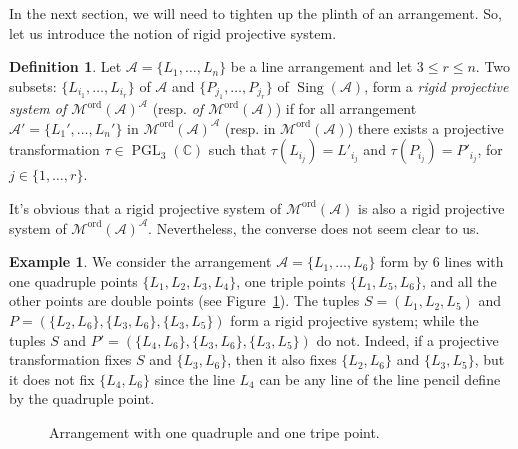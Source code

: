 \documentclass[11pt, a4paper]{amsart}
\theoremstyle{definition}
\newtheorem{definition}[theorem]{Definition}
\newtheorem{example}[theorem]{Example}
\theoremstyle{remark}
\newcommand{\CC}{\mathds{C}}
\newcommand{\A}{\mathcal{A}}
\newcommand{\M}{\mathcal{M}}
\newcommand{\ord}{\text{ord}}
\DeclareMathOperator{\sing}{Sing}
\DeclareMathOperator{\PGL}{PGL}
\begin{document}
In the next section, we will need to tighten up the plinth of an arrangement. So, let us introduce the notion of rigid projective system.

\begin{definition}\label{def:RPS}
	Let $\A=\{L_1,\dots,L_n\}$  be a line arrangement and let $3 \leq r \leq n$. Two subsets: $\{L_{i_1},\dots,L_{i_r}\}$ of $\A$ and $\{P_{j_1},\dots,P_{j_r}\}$ of $\sing(\A)$, form a \emph{rigid projective system of $\M^\ord(\A)^\A$} (resp. \emph{of $\M^\ord(\A)$}) if for all arrangement $\A'=\{L_1',\dots,L_n'\}$ in $\M^\ord(\A)^\A$ (resp. in $\M^\ord(\A)$) there exists a projective transformation $\tau\in\PGL_3(\CC)$ such that $\tau(L_{i_j})=L'_{i_j}$ and $\tau(P_{i_j})=P'_{i_j}$, for $j\in\{1,\dots,r\}$. 
\end{definition}

It's obvious that a rigid projective system of $\M^\ord(\A)$ is also a rigid projective system of $\M^\ord(\A)^\A$. Nevertheless, the converse does not seem clear to us.

\begin{example}\label{ex:plinth}
	We consider the arrangement $\A=\{L_1,\dots,L_6\}$ form by 6 lines with one quadruple points $\{L_1,L_2,L_3,L_4\}$, one triple points $\{L_1,L_5,L_6\}$, and all the other points are double points (see Figure~\ref{fig:arr_1}). The tuples $S=(L_1,L_2,L_5)$ and $P=(\{L_2,L_6\},\{L_3,L_6\},\{L_3,L_5\})$ form a rigid projective system; while the tuples $S$ and $P'=(\{L_4,L_6\},\{L_3,L_6\},\{L_3,L_5\})$ do not. Indeed, if a projective transformation fixes $S$ and $\{L_3,L_6\}$, then it also fixes $\{L_2,L_6\}$ and $\{L_3,L_5\}$, but it does not fix $\{L_4,L_6\}$ since the line $L_4$ can be any line of the line pencil define by the quadruple point.
\end{example}

\begin{figure}[h!]
	\caption{Arrangement with one quadruple and one tripe point. \label{fig:arr_1}}
\end{figure}
\end{document}
